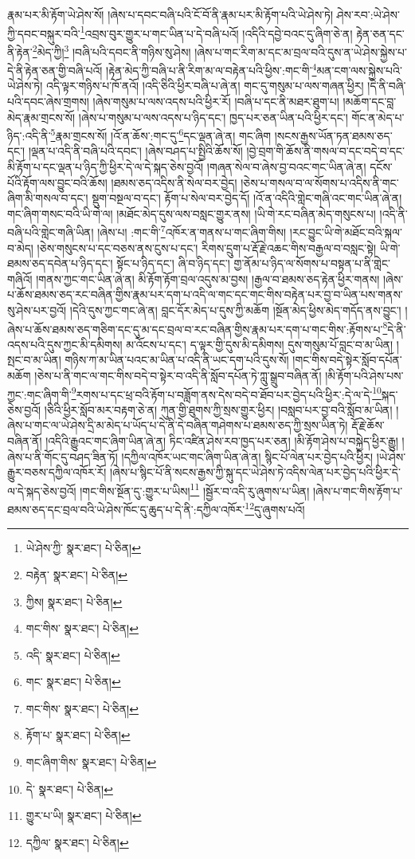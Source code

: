 རྣམ་པར་མི་རྟོག་ཡེ་ཤེས་སོ། །ཞེས་པ་དབང་བཞི་པའི་ངོ་བོ་ནི་རྣམ་པར་མི་རྟོག་པའི་ཡེ་ཤེས་ཏེ། ཤེས་རབ་:ཡེ་ཤེས་ཀྱི་དབང་བསྐུར་བའི་\footnote{ཡེ་ཤེས་ཀྱི་  སྣར་ཐང་།  པེ་ཅིན། }འབྲས་བུར་གྱུར་པ་གང་ཡིན་པ་དེ་བཞི་པའོ། །འདིའི་དབྱེ་བའང་དུ་ཞིག་ཅེ་ན། རྟེན་ཅན་དང་ནི་རྟེན་\footnote{བརྟེན་  སྣར་ཐང་།  པེ་ཅིན། }མེད་ཀྱི།\footnote{ཀྱིས།  སྣར་ཐང་།  པེ་ཅིན། } །བཞི་པའི་དབང་ནི་གཉིས་སུ་ཤེས། །ཞེས་པ་གང་རིག་མ་དང་མ་བྲལ་བའི་དུས་ན་ཡེ་ཤེས་སྐྱེས་པ་དེ་ནི་རྟེན་ཅན་གྱི་བཞི་པའོ། །རྟེན་མེད་ཀྱི་བཞི་པ་ནི་རིག་མ་ལ་བརྟེན་པའི་ཕྱིས་:གང་གི་\footnote{གང་གིས་  སྣར་ཐང་།  པེ་ཅིན། }མན་ངག་ལས་སྐྱེས་པའི་ཡེ་ཤེས་ཏེ། འདི་ལྟར་གཉིས་པ་ཁོ་ནའོ། །འདི་ཅིའི་ཕྱིར་བཞི་པ་ཞེ་ན། གང་དུ་གསུམ་པ་ལས་གཞན་ཕྱིར། །དེ་ནི་བཞི་པའི་དབང་ཞེས་གྲགས། །ཞེས་གསུམ་པ་ལས་འདས་པའི་ཕྱིར་རོ། །བཞི་པ་དང་ནི་མཐར་ཐུག་པ། །མཆོག་དང་བླ་མེད་རྣམ་གྲངས་སོ། །ཞེས་པ་གསུམ་པ་ལས་འདས་པ་ཉིད་དང་། ཁྱད་པར་ཅན་ཡིན་པའི་ཕྱིར་དང་། གོང་ན་མེད་པ་ཉིད་:འདི་ནི་\footnote{འདི་  སྣར་ཐང་།  པེ་ཅིན། }རྣམ་གྲངས་སོ། །འོ་ན་ཆོས་:གང་དུ་\footnote{གང་  སྣར་ཐང་།  པེ་ཅིན། }དང་ལྡན་ཞེ་ན། གང་ཞིག །སངས་རྒྱས་ཡོན་ཏན་ཐམས་ཅད་དང་། །ལྡན་པ་འདི་ནི་བཞི་པའི་དབང་། །ཞེས་བཤད་པ་སྤྱིའི་ཆོས་སོ། །བྱེ་བྲག་གི་ཆོས་ནི་གསལ་བ་དང་བདེ་བ་དང་མི་རྟོག་པ་དང་ལྡན་པ་ཉིད་ཀྱི་ཕྱིར་དེ་ལ་དེ་སྐད་ཅེས་བྱའོ། །གཞན་སེལ་བ་ཞེས་བྱ་བའང་གང་ཡིན་ཞེ་ན། དངོས་པོའི་རྟོག་ལས་བྱུང་བའི་ཆོས། །ཐམས་ཅད་འདིས་ནི་སེལ་བར་བྱེད། །ཅེས་པ་གསལ་བ་ལ་སོགས་པ་འདིས་ནི་གང་ཞིག་མི་གསལ་བ་དང་། སྡུག་བསྔལ་བ་དང་། རྟོག་པ་སེལ་བར་བྱེད་དོ། །འོ་ན་འདིའི་གླེང་གཞི་འང་གང་ཡིན་ཞེ་ན། གང་ཞིག་གསང་བའི་ཡི་གེ་ལ། །མཐོང་མེད་དུས་ལས་བསླང་གྱུར་ནས། །ཡི་གེ་རང་བཞིན་མེད་གསུངས་པ། །འདི་ནི་བཞི་པའི་གླེང་གཞི་ཡིན། །ཞེས་པ། :གང་གི་\footnote{གང་གིས་  སྣར་ཐང་།  པེ་ཅིན། }འཁོར་ན་གནས་པ་གང་ཞིག་གིས། །རང་བྱུང་ཡི་གེ་མཐོང་བའི་སྐལ་བ་མེད། །ཅེས་གསུངས་པ་དང་བཅས་ནས་ངུས་པ་དང་། རིགས་དྲུག་པ་རྡོ་རྗེ་འཆང་གིས་བརྒྱལ་བ་བསླང་སྟེ། ཡི་གེ་ཐམས་ཅད་དབེན་པ་ཉིད་དང་། སྟོང་པ་ཉིད་དང་། ཞི་བ་ཉིད་དང་། གྱ་ནོམ་པ་ཉིད་ལ་སོགས་པ་བསྟན་པ་ནི་གླེང་གཞིའོ། །གནས་ཀྱང་གང་ཡིན་ཞེ་ན། མི་རྟོག་རྟོག་བྲལ་འདུས་མ་བྱས། །རྒྱལ་བ་ཐམས་ཅད་རྟེན་ཕྱིར་གནས། །ཞེས་པ་ཆོས་ཐམས་ཅད་རང་བཞིན་གྱིས་རྣམ་པར་དག་པ་འདི་ལ་གང་དང་གང་གིས་བརྟེན་པར་བྱ་བ་ཡིན་པས་གནས་སུ་ཤེས་པར་བྱའོ། །དེའི་དུས་ཀྱང་གང་ཞེ་ན། བླང་དོར་མེད་པ་དུས་ཀྱི་མཆོག །སྔོན་མེད་ཕྱིས་མེད་གདོད་ནས་བྱུང་། །ཞེས་པ་ཆོས་ཐམས་ཅད་གཅིག་དང་དུ་མ་དང་བྲལ་བ་རང་བཞིན་གྱིས་རྣམ་པར་དག་པ་གང་གིས་:རྟོགས་པ་\footnote{རྟོག་པ་  སྣར་ཐང་།  པེ་ཅིན། }དེ་ནི་འདས་པའི་དུས་ཀྱང་མི་དམིགས། མ་འོངས་པ་དང་། ད་ལྟར་གྱི་དུས་མི་དམིགས། དུས་གསུམ་པོ་བླང་བ་མ་ཡིན། །སྤང་བ་མ་ཡིན། གཉིས་ཀ་མ་ཡིན་པའང་མ་ཡིན་པ་འདི་ནི་ཡང་དག་པའི་དུས་སོ། །གང་གིས་བདེ་སྟེར་སློབ་དཔོན་མཆོག །ཅེས་པ་ནི་གང་ལ་གང་གིས་བདེ་བ་སྟེར་བ་འདི་ནི་སློབ་དཔོན་ཏེ་ཀླུ་སྒྲུབ་བཞིན་ནོ། །མི་རྟོག་པའི་ཤེས་པས་ཀྱང་:གང་ཞིག་གི་\footnote{གང་ཞིག་གིས་  སྣར་ཐང་།  པེ་ཅིན། }རགས་པ་དང་ཕྲ་བའི་རྟོག་པ་བཟློག་ནས་དེས་བདེ་བ་ཐོབ་པར་བྱེད་པའི་ཕྱིར་:དེ་ལ་དེ་\footnote{དེ་  སྣར་ཐང་།  པེ་ཅིན། }སྐད་ཅེས་བྱའོ། །ཅིའི་ཕྱིར་སློབ་མར་བརྟག་ཅེ་ན། ཀུན་གྱི་ཐུགས་ཀྱི་སྲས་གྱུར་ཕྱིར། །བསླབ་པར་བྱ་བའི་སློབ་མ་ཡིན། །ཞེས་པ་གང་ལ་ཡེ་ཤེས་དྲི་མ་མེད་པ་ཡོད་པ་དེ་ནི་དེ་བཞིན་གཤེགས་པ་ཐམས་ཅད་ཀྱི་སྲས་ཡིན་ཏེ། རྡོ་རྗེ་ཆོས་བཞིན་ནོ། །འདིའི་རྒྱུའང་གང་ཞིག་ཡིན་ཞེ་ན། ཏིང་འཛིན་ཤེས་རབ་ཁྱད་པར་ཅན། །མི་རྟོག་ཤེས་པ་བསྐྱེད་ཕྱིར་རྒྱུ། །ཞེས་པ་ནི་གོང་དུ་བཤད་ཟིན་ཏོ། །དཀྱིལ་འཁོར་ཡང་གང་ཞིག་ཡིན་ཞེ་ན། སྙིང་པོ་ལེན་པར་བྱེད་པའི་ཕྱིར། །ཡེ་ཤེས་རྒྱུར་བཅས་དཀྱིལ་འཁོར་རོ། །ཞེས་པ་སྙིང་པོ་ནི་སངས་རྒྱས་ཀྱི་སྐུ་དང་ཡེ་ཤེས་ཏེ་འདིས་ལེན་པར་བྱེད་པའི་ཕྱིར་དེ་ལ་དེ་སྐད་ཅེས་བྱའོ། །གང་གིས་སྔོན་དུ་:གྱུར་པ་ཡིས།\footnote{གྱུར་པ་ཡི།  སྣར་ཐང་།  པེ་ཅིན། } །སྦྱོར་བ་འདི་རུ་ཞུགས་པ་ཡིན། །ཞེས་པ་གང་གིས་རྟོག་པ་ཐམས་ཅད་དང་བྲལ་བའི་ཡེ་ཤེས་ཁོང་དུ་ཆུད་པ་དེ་ནི་:དཀྱིལ་འཁོར་\footnote{དཀྱིལ་  སྣར་ཐང་།  པེ་ཅིན། }དུ་ཞུགས་པའོ། 